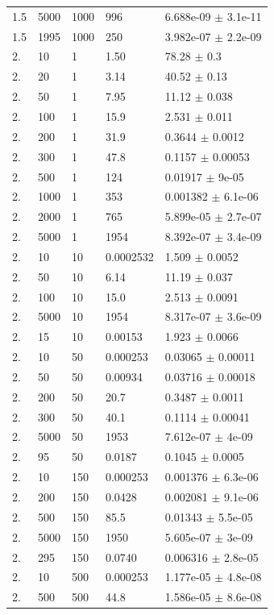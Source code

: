 \begin{longtable}{lllll}
	1.5 & 5000 & 1000 & 996 & 6.688e-09 $\pm$ 3.1e-11 \\
	1.5 & 1995 & 1000 & 250 & 3.982e-07 $\pm$ 2.2e-09 \\
	2. & 10 & 1 & 1.50 & 78.28 $\pm$ 0.3 \\
	2. & 20 & 1 & 3.14 & 40.52 $\pm$ 0.13 \\
	2. & 50 & 1 & 7.95 & 11.12 $\pm$ 0.038 \\
	2. & 100 & 1 & 15.9 & 2.531 $\pm$ 0.011 \\
	2. & 200 & 1 & 31.9 & 0.3644 $\pm$ 0.0012 \\
	2. & 300 & 1 & 47.8 & 0.1157 $\pm$ 0.00053 \\
	2. & 500 & 1 & 124 & 0.01917 $\pm$ 9e-05 \\
	2. & 1000 & 1 & 353 & 0.001382 $\pm$ 6.1e-06 \\
	2. & 2000 & 1 & 765 & 5.899e-05 $\pm$ 2.7e-07 \\
	2. & 5000 & 1 & 1954 & 8.392e-07 $\pm$ 3.4e-09 \\
	2. & 10 & 10 & 0.0002532 & 1.509 $\pm$ 0.0052 \\
	2. & 50 & 10 & 6.14 & 11.19 $\pm$ 0.037 \\
	2. & 100 & 10 & 15.0 & 2.513 $\pm$ 0.0091 \\
	2. & 5000 & 10 & 1954 & 8.317e-07 $\pm$ 3.6e-09 \\
	2. & 15 & 10 & 0.00153 & 1.923 $\pm$ 0.0066 \\
	2. & 10 & 50 & 0.000253 & 0.03065 $\pm$ 0.00011 \\
	2. & 50 & 50 & 0.00934 & 0.03716 $\pm$ 0.00018 \\
	2. & 200 & 50 & 20.7 & 0.3487 $\pm$ 0.0011 \\
	2. & 300 & 50 & 40.1 & 0.1114 $\pm$ 0.00041 \\
	2. & 5000 & 50 & 1953 & 7.612e-07 $\pm$ 4e-09 \\
	2. & 95 & 50 & 0.0187 & 0.1045 $\pm$ 0.0005 \\
	2. & 10 & 150 & 0.000253 & 0.001376 $\pm$ 6.3e-06 \\
	2. & 200 & 150 & 0.0428 & 0.002081 $\pm$ 9.1e-06 \\
	2. & 500 & 150 & 85.5 & 0.01343 $\pm$ 5.5e-05 \\
	2. & 5000 & 150 & 1950 & 5.605e-07 $\pm$ 3e-09 \\
	2. & 295 & 150 & 0.0740 & 0.006316 $\pm$ 2.8e-05 \\
	2. & 10 & 500 & 0.000253 & 1.177e-05 $\pm$ 4.8e-08 \\
	2. & 500 & 500 & 44.8 & 1.586e-05 $\pm$ 8.6e-08 \\

\end{longtable}

